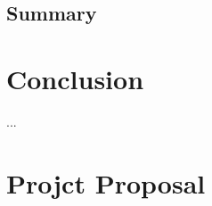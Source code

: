 \documentclass[12pt,twoside,notitlepage]{report}
\begin{document}
\section{Summary}


\newpage

\chapter{Conclusion}

...



\cleardoublepage



\newpage

\appendix

\cleardoublepage

\chapter{Projct Proposal}

% 
\end{document}
